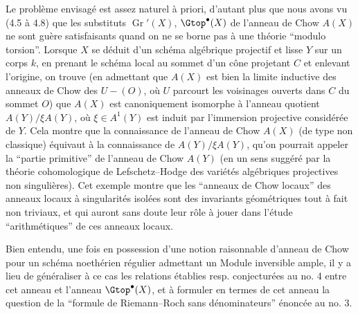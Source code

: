 Le problème envisagé est assez naturel à priori, d'autant plus que nous avons vu (4.5 à 4.8) que les substituts $\operatorname{Gr}'(X)$, $\Gtop^\bullet(X)$ de l'anneau de Chow $A(X)$ ne sont guère satisfaisants quand on ne se borne pas à une théorie ``modulo torsion''. Lorsque $X$ se déduit d'un schéma algébrique projectif et lisse $Y$ sur un corps $k$, en prenant le schéma local au sommet d'un cône projetant $C$ et enlevant l'origine, on trouve (en admettant que $A(X)$ est bien la limite inductive des anneaux de Chow des $U-(O)$, où $U$ parcourt les voisinages ouverts dans $C$ du sommet $O$) que $A(X)$ est canoniquement isomorphe à l'anneau quotient $A(Y)/\xi A(Y)$, où $\xi\in A^1(Y)$ est induit par l'immersion projective considérée de $Y$. Cela montre que la connaissance de l'anneau de Chow $A(X)$ (de type non classique) équivaut à la connaissance de $A(Y)/\xi A(Y)$, qu'on pourrait appeler la ``partie primitive'' de l'anneau de Chow $A(Y)$ (en un sens suggéré par la théorie cohomologique de Lefschetz--Hodge des variétés algébriques projectives non singulières). Cet exemple montre que les ``anneaux de Chow locaux'' des anneaux locaux à singularités
isolées sont des invariants géométriques tout à fait non triviaux, et qui auront sans doute leur rôle à jouer dans l'étude ``arithmétiques'' de ces anneaux locaux.

Bien entendu, une fois en possession d'une notion raisonnable d'anneau de Chow pour un schéma noethérien régulier admettant un Module inversible ample, il y a lieu de généraliser à ce cas les relations établies resp. conjecturées au no. 4 entre cet anneau et l'anneau $\Gtop^\bullet(X)$, et à formuler en termes de cet anneau la question de la ``formule de Riemann--Roch sans dénominateurs'' énoncée au no. 3.

